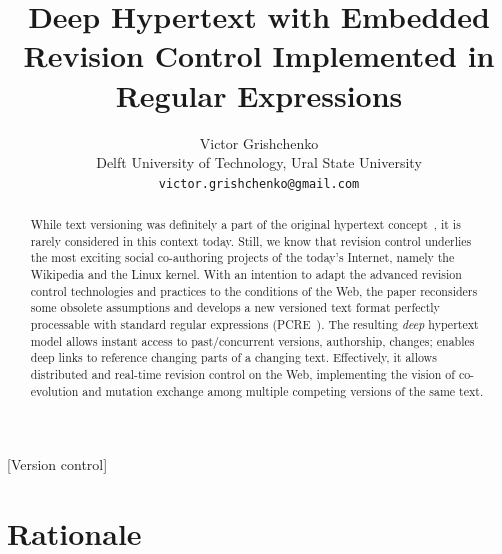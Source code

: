 \documentclass{sig-alternate}
\begin{document}

\title{Deep Hypertext with Embedded Revision Control Implemented in Regular Expressions}

\author{Victor Grishchenko \\ \small Delft University of Technology, Ural State University \\ {\tt victor.grishchenko@gmail.com} }

\maketitle

\begin{abstract}
While text versioning was definitely a part of the original hypertext concept~\cite{nls,literary,hyp-ed-sys}, it is rarely considered in this context today.
Still, we know that revision control underlies the most exciting social co-authoring projects of the today's Internet, namely the Wikipedia and the Linux kernel.
With an intention to adapt the advanced revision control technologies and practices to the conditions of the Web, the paper reconsiders some obsolete assumptions and develops a new versioned text format perfectly processable with standard regular expressions (PCRE~\cite{pcre}).
The resulting \emph{deep} hypertext model allows instant access to past/concurrent versions, authorship, changes; enables deep links to reference changing parts of a changing text.
Effectively, it allows distributed and real-time revision control on the Web, implementing the vision of co-evolution and mutation exchange among multiple competing versions of the same text. 

\end{abstract}

[Version control]

\section{Rationale}
\end{document}
